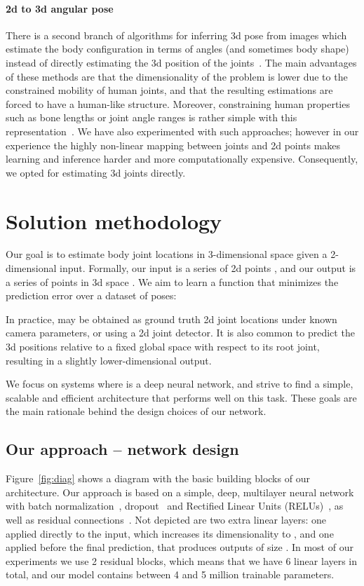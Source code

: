 \documentclass[10pt,twocolumn,letterpaper]{article}
\begin{document}
\paragraph{2d to 3d angular pose}
There is a second branch of algorithms for inferring 3d pose from images which estimate the body configuration in terms of angles (and sometimes body shape) instead of directly estimating the 3d position of the joints~\cite{barron_2001,ParameswaranC04,keep-it-simpl,zhou2016deep}. The main advantages of these methods are that the dimensionality of the problem is lower due to the constrained mobility of human joints, and that the resulting estimations are forced to have a human-like structure.
Moreover, constraining human properties such as bone lengths or joint angle
ranges is rather simple with this representation~\cite{WeiC09}.
We have also experimented with such approaches; however in our experience the highly non-linear mapping between joints and 2d points makes learning and inference harder and more computationally expensive. Consequently, we opted for estimating 3d joints directly.

\section{Solution methodology}

Our goal is to estimate body joint locations in 3-dimensional space given a 2-dimensional input. Formally, our input is a series of 2d points , and our output is a series of points in 3d space . We aim to learn a function  that minimizes the prediction error over a dataset of  poses:


In practice,  may be obtained as ground truth 2d joint locations under known camera parameters, or using a 2d joint detector. It is also common to predict the 3d positions relative to a fixed global space with respect to its root joint, resulting in a slightly lower-dimensional output.


We focus on systems where  is a deep neural network, and strive to find a simple, scalable and efficient architecture that performs well on this task. These goals are the main rationale behind the design choices of our network.

\subsection{Our approach -- network design}

Figure~\ref{fig:diag} shows a diagram with the basic building blocks of our architecture.
Our approach is based on a simple, deep, multilayer neural network with batch normalization~\cite{batch-norm}, dropout~\cite{dropout} and Rectified Linear Units (RELUs)~\cite{relu}, as well as residual connections~\cite{he2016deep}.
Not depicted are two extra linear layers: one applied directly to the input, which increases its dimensionality to , and one applied before the final prediction, that produces outputs of size .
In most of our experiments we use 2 residual blocks, which means that we have 6 linear layers in total, and our model contains between 4 and 5 million trainable parameters.
\end{document}
